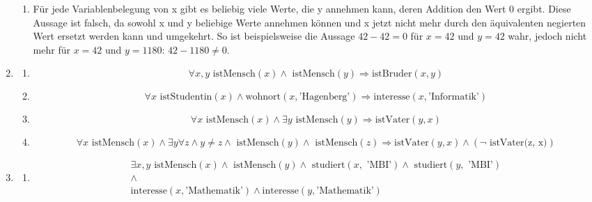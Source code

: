 \documentclass[a4paper]{article}
\begin{document}
\begin{enumerate}
\begin{enumerate}
			\item
			Für jede Variablenbelegung von x gibt es beliebig viele Werte, die y annehmen kann, deren Addition den Wert 0 ergibt.
			\newline
			Diese Aussage ist falsch, da sowohl x und y beliebige Werte annehmen können und x jetzt nicht mehr durch den äquivalenten negierten Wert ersetzt werden kann und umgekehrt.
			\newline
			So ist beispielsweise die Aussage $42 - 42 = 0$ für $x = 42$ und $y = 42$ wahr, jedoch nicht mehr für $x = 42$ und $y = 1180$: $42 - 1180 \neq 0$.
		\end{enumerate}
		
		\item
		\begin{enumerate}
			\item
			\begin{equation*}
				\forall x, y \text{ istMensch}(x) \land \text{ istMensch}(y) \Rightarrow \text{istBruder}(x, y)
			\end{equation*}
			
			\item
			\begin{equation*}
				\forall x \text{ istStudentin}(x) \land \text{wohnort}(x, \text{'Hagenberg'}) \Rightarrow \text{interesse}(x, \text{'Informatik'})
			\end{equation*}
			
			\item
			\begin{equation*}
				\forall x \text{ istMensch}(x) \land \exists y \text{ istMensch}(y) \Rightarrow \text{istVater}(y, x)
			\end{equation*}
			
			\item
			\begin{equation*}
				\forall x \text{ istMensch}(x) \land \exists y \forall z \land y \neq z \land \text{ istMensch}(y) \land \text{ istMensch}(z) \Rightarrow \text{istVater}(y, x) \land (\lnot \text{ istVater(z, x)})
			\end{equation*}
		\end{enumerate}
		
		\item
		\begin{enumerate}
			\item
			\begin{equation*}
				\begin{aligned}
					\exists x, y \text{ istMensch}(x) \land \text{ istMensch}(y) \land \text{ studiert}(x, \text{ 'MBI'}) \land \text{ studiert}(y, \text{ 'MBI'}) \\ \land \\ \text{interesse}(x, \text{'Mathematik'}) \land \text{interesse}(y, \text{'Mathematik'})
				\end{aligned}
			\end{equation*}
			

\end{enumerate}
\end{enumerate}
\end{document}
